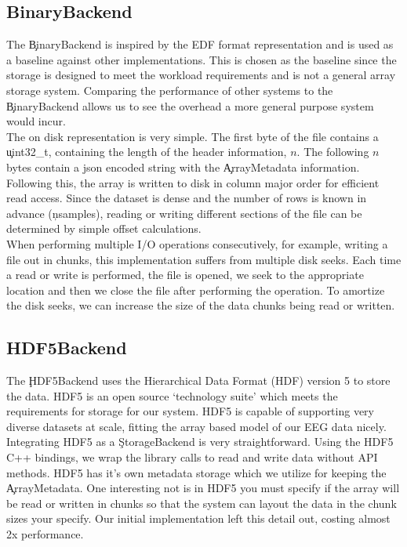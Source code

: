\subsection{BinaryBackend}

The \c{BinaryBackend} is inspired by the EDF format representation and is used
as a baseline against other implementations. This is chosen as the baseline
since the storage is designed to meet the workload requirements and is not a
general array storage system. Comparing the performance of other systems to the
\c{BinaryBackend} allows us to see the overhead a more general purpose system
would incur.\\

The on disk representation is very simple. The first byte of the file contains
a \c{uint32\_t}, containing the length of the header information, $n$. The
following $n$ bytes contain a json encoded string with the \c{ArrayMetadata}
information. Following this, the array is written to disk in column major order
for efficient read access. Since the dataset is dense and the number of rows is
known in advance (\c{nsamples}), reading or writing different sections of the
file can be determined by simple offset calculations.\\

When performing multiple I/O operations consecutively, for example, writing a
file out in chunks, this implementation suffers from multiple disk seeks. Each
time a read or write is performed, the file is opened, we seek to the
appropriate location and then we close the file after performing the operation.
To amortize the disk seeks, we can increase the size of the data chunks being
read or written.

\subsection{HDF5Backend}

The \c{HDF5Backend} uses the Hierarchical Data Format (HDF) version 5
\cite{hdf5} to store the data. HDF5 is an open source `technology suite' which
meets the requirements for storage for our system. HDF5 is capable of
supporting very diverse datasets at scale, fitting the array based model of our
EEG data nicely. \\

Integrating HDF5 as a \c{StorageBackend} is very straightforward. Using the
HDF5 C++ bindings, we wrap the library calls to read and write data without API
methods. HDF5 has it's own metadata storage which we utilize for keeping the
\c{ArrayMetadata}. One interesting not is in HDF5 you must specify if the array
will be read or written in chunks so that the system can layout the data in the
chunk sizes your specify. Our initial implementation left this detail out,
costing almost 2x performance.

